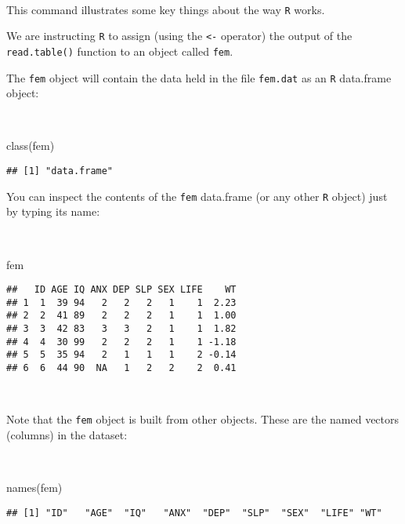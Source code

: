 \documentclass[
  12pt,
  a4paper]{book}
\newenvironment{Shaded}{\begin{snugshade}}{\end{snugshade}}
\newcommand{\FunctionTok}[1]{\textcolor[rgb]{0.00,0.00,0.00}{#1}}
\newcommand{\NormalTok}[1]{#1}
\begin{document}
~

This command illustrates some key things about the way \texttt{R} works.

We are instructing \texttt{R} to assign (using the \texttt{\textless{}-} operator) the output of the \texttt{read.table()} function to an object
called \texttt{fem}.

The \texttt{fem} object will contain the data held in the file \texttt{fem.dat} as an \texttt{R} data.frame object:

~

\begin{Shaded}
\begin{Highlighting}[]
\FunctionTok{class}\NormalTok{(fem)}
\end{Highlighting}
\end{Shaded}

\begin{verbatim}
## [1] "data.frame"
\end{verbatim}

\newpage

You can inspect the contents of the \texttt{fem} data.frame (or any other \texttt{R} object) just by typing its name:

~

\begin{Shaded}
\begin{Highlighting}[]
\NormalTok{fem}
\end{Highlighting}
\end{Shaded}

\begin{verbatim}
##   ID AGE IQ ANX DEP SLP SEX LIFE    WT
## 1  1  39 94   2   2   2   1    1  2.23
## 2  2  41 89   2   2   2   1    1  1.00
## 3  3  42 83   3   3   2   1    1  1.82
## 4  4  30 99   2   2   2   1    1 -1.18
## 5  5  35 94   2   1   1   1    2 -0.14
## 6  6  44 90  NA   1   2   2    2  0.41
\end{verbatim}

~

Note that the \texttt{fem} object is built from other objects. These are the named vectors (columns) in the dataset:

~

\begin{Shaded}
\begin{Highlighting}[]
\FunctionTok{names}\NormalTok{(fem)}
\end{Highlighting}
\end{Shaded}

\begin{verbatim}
## [1] "ID"   "AGE"  "IQ"   "ANX"  "DEP"  "SLP"  "SEX"  "LIFE" "WT"
\end{verbatim}
\end{document}

